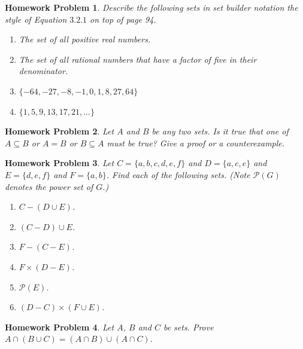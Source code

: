 \documentclass{article}
\newtheorem{hw}{Homework Problem}
\begin{document}
	\underline{\hspace{5in}}


	\begin{hw}
		Describe the following sets in set builder notation the style of Equation $3.2.1$ on top of page 94.
		\begin{enumerate}
			\item The set of all positive real numbers.
			\item The set of all rational numbers that have a factor of five in their denominator.
			\item $\{ -64, -27, -8, -1, 0, 1, 8, 27, 64\}$
			\item $\{1, 5, 9, 13, 17, 21, ... \}$
		\end{enumerate}
	\end{hw}
	\begin{hw}
		Let $A$ and $B$ be any two sets. Is it true that one of $A \subseteq B$ or $A=B$ or $B \subseteq A$ must be true? Give a proof or a counterexample.
	\end{hw}
	\begin{hw}
		Let $C = \{a, b, c, d, e, f \}$ and $D = \{a, c, e \}$ and $E = \{d, e, f\}$ and $F = \{a, b \}$. Find each of the following sets. (Note $\mathcal{P}(G)$ denotes the power set of $G$.)
		\begin{enumerate}
			\item $C - (D \cup E)$.
			\item $(C-D) \cup E$.
			\item $F - (C - E)$.
			\item $F \times (D - E)$.
			\item $\mathcal{P}(E)$.
			\item $(D-C) \times (F \cup E)$.
		\end{enumerate}
	\end{hw}
	\begin{hw}
		Let $A$, $B$ and $C$ be sets.
		Prove $A \cap (B \cup C) = (A \cap B) \cup (A \cap C).$
	\end{hw}
\end{document}
